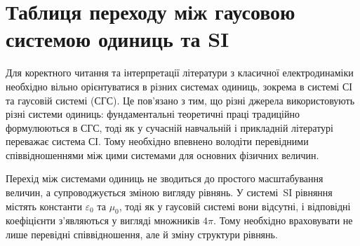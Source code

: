 


\section{Таблиця переходу між гаусовою системою одиниць та SI}\label{sec:SGStoSI}

Для коректного читання та інтерпретації літератури з класичної електродинаміки необхідно вільно орієнтуватися в різних системах одиниць, зокрема в системі СІ та гаусовій системі (СГС). Це пов'язано з тим, що різні джерела використовують різні системи одиниць: фундаментальні теоретичні праці традиційно формулюються в СГС, тоді як у сучасній навчальній і прикладній літературі переважає система СІ. Тому необхідно впевнено володіти перевідними співвідношеннями між цими системами для основних фізичних величин.

Перехід між системами одиниць не зводиться до простого масштабування величин, а супроводжується зміною вигляду рівнянь. У системі~SI рівняння містять константи \(\varepsilon_0\) та \(\mu_0\), тоді як у гаусовій системі вони відсутні, і відповідні коефіцієнти з'являються у вигляді множників \(4 \pi \). Тому необхідно враховувати не лише перевідні співвідношення, але й зміну структури рівнянь.

